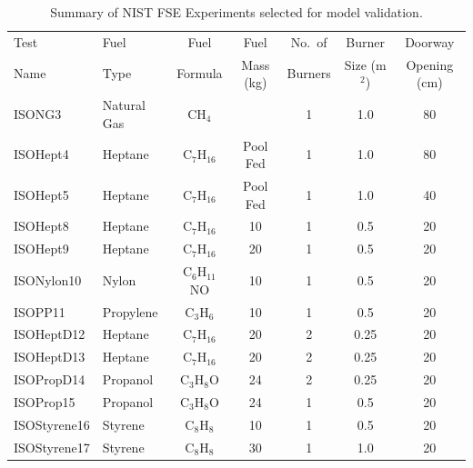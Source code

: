 \begin{table}[!ht]
\caption[Summary of NIST FSE Experiments selected for model validation]{Summary of NIST FSE Experiments selected for model validation.}
\begin{center}
\begin{tabular}{|l|l|c|c|c|c|c|}
\hline
Test          &  Fuel         &  Fuel             &  Fuel      &  No.~of   &  Burner       &  Doorway          \\
Name          &  Type         &  Formula          &  Mass (kg) &  Burners  &  Size (m$^2$) &  Opening (cm)     \\ \hline \hline
ISONG3        &  Natural Gas  &  CH$_4$           &            &  1        &  1.0          &  80               \\ \hline
ISOHept4      &  Heptane      &  C$_7$H$_{16}$    &  Pool Fed  &  1        &  1.0          &  80               \\ \hline
ISOHept5      &  Heptane      &  C$_7$H$_{16}$    &  Pool Fed  &  1        &  1.0          &  40               \\ \hline
ISOHept8      &  Heptane      &  C$_7$H$_{16}$    &  10        &  1        &  0.5          &  20               \\ \hline
ISOHept9      &  Heptane      &  C$_7$H$_{16}$    &  20        &  1        &  0.5          &  20               \\ \hline
ISONylon10    &  Nylon        &  C$_6$H$_{11}$NO  &  10        &  1        &  0.5          &  20               \\ \hline
ISOPP11       &  Propylene    &  C$_3$H$_6$       &  10        &  1        &  0.5          &  20               \\ \hline
ISOHeptD12    &  Heptane      &  C$_7$H$_{16}$    &  20        &  2        &  0.25         &  20               \\ \hline
ISOHeptD13    &  Heptane      &  C$_7$H$_{16}$    &  20        &  2        &  0.25         &  20               \\ \hline
ISOPropD14    &  Propanol     &  C$_3$H$_8$O      &  24        &  2        &  0.25         &  20               \\ \hline
ISOProp15     &  Propanol     &  C$_3$H$_8$O      &  24        &  1        &  0.5          &  20               \\ \hline
ISOStyrene16  &  Styrene      &  C$_8$H$_8$       &  10        &  1        &  0.5          &  20               \\ \hline
ISOStyrene17  &  Styrene      &  C$_8$H$_8$       &  30        &  1        &  1.0          &  20               \\ \hline

\end{tabular}
\end{center}
\end{table}
